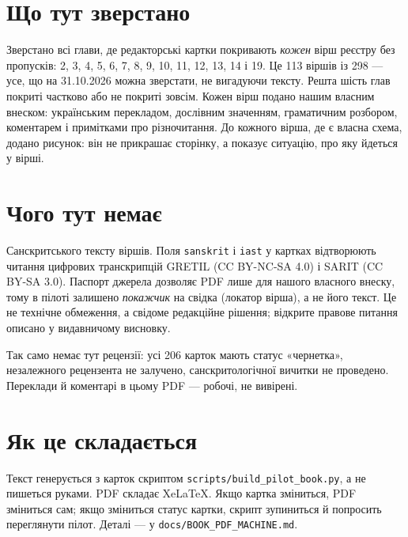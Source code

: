 \documentclass[10pt,a5paper,openany]{book}
\begin{document}
\section*{Що тут зверстано}

Зверстано всі глави, де редакторські картки покривають \emph{кожен} вірш
реєстру без пропусків: 2, 3, 4, 5, 6, 7, 8, 9, 10, 11, 12, 13, 14 і 19.
Це 113 віршів із 298 — усе, що на 31.10.2026 можна зверстати, не вигадуючи
тексту. Решта шість глав покриті частково або не покриті зовсім.
Кожен вірш подано нашим власним внеском: українським перекладом, дослівним
значенням, граматичним розбором, коментарем і примітками про різночитання.
До кожного вірша, де є власна схема, додано рисунок: він не прикрашає
сторінку, а показує ситуацію, про яку йдеться у вірші.

\section*{Чого тут немає}

Санскритського тексту віршів. Поля \texttt{sanskrit} і \texttt{iast} у картках
відтворюють читання цифрових транскрипцій GRETIL (CC BY-NC-SA 4.0) і SARIT
(CC BY-SA 3.0). Паспорт джерела дозволяє PDF лише для нашого власного внеску,
тому в пілоті залишено \emph{покажчик} на свідка (локатор вірша), а не його
текст. Це не технічне обмеження, а свідоме редакційне рішення; відкрите
правове питання описано у видавничому висновку.

Так само немає тут рецензії: усі 206 карток мають статус «чернетка»,
незалежного рецензента не залучено, санскритологічної вичитки не проведено.
Переклади й коментарі в цьому PDF — робочі, не вивірені.

\section*{Як це складається}

Текст генерується з карток скриптом \texttt{scripts/}\allowbreak\texttt{build\_}\allowbreak\texttt{pilot\_}\allowbreak\texttt{book.py},
а не пишеться руками. PDF складає XeLaTeX. Якщо картка зміниться, PDF
зміниться сам; якщо зміниться статус картки, скрипт зупиниться й попросить
переглянути пілот. Деталі — у \texttt{docs/}\allowbreak\texttt{BOOK\_}\allowbreak\texttt{PDF\_}\allowbreak\texttt{MACHINE.md}.

\mainmatter


\backmatter
\end{document}
